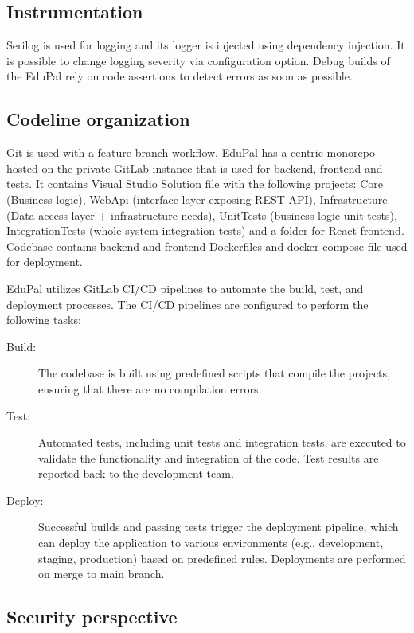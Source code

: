 \subsection{Instrumentation}

Serilog is used for logging and its logger is injected using dependency injection. It is possible to change logging severity via configuration option. Debug builds of the EduPal rely on code assertions to detect errors as soon as possible.

\subsection{Codeline organization}

Git is used with a feature branch workflow. EduPal has a centric monorepo hosted on the private GitLab instance that is used for backend, frontend and tests. It contains Visual Studio Solution file with the following projects: Core (Business logic), WebApi (interface layer exposing REST API), Infrastructure (Data access layer + infrastructure needs), UnitTests (business logic unit tests), IntegrationTests (whole system integration tests) and a folder for React frontend. Codebase contains backend and frontend Dockerfiles and docker compose file used for deployment.

EduPal utilizes GitLab CI/CD pipelines to automate the build, test, and deployment processes. The CI/CD pipelines are configured to perform the following tasks:

\begin{description}
\item[Build:] The codebase is built using predefined scripts that compile the projects, ensuring that there are no compilation errors.

\item[Test:] Automated tests, including unit tests and integration tests, are executed to validate the functionality and integration of the code. Test results are reported back to the development team.

\item[Deploy:] Successful builds and passing tests trigger the deployment pipeline, which can deploy the application to various environments (e.g., development, staging, production) based on predefined rules. Deployments are performed on merge to main branch.
\end{description}

\subsection{Security perspective}

